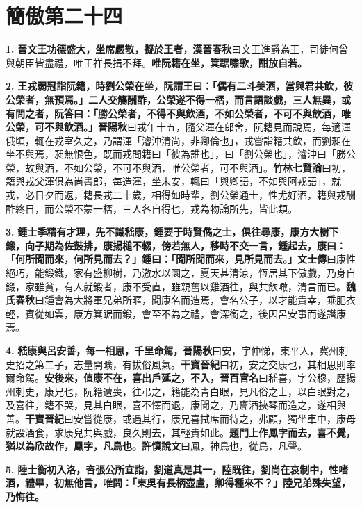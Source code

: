 \chapter{簡傲第二十四}

\textbf{1.} \textbf{晉文王功德盛大，坐席嚴敬，擬於王者，}{\footnotesize \textbf{漢晉春秋}曰文王進爵為王，司徒何曾與朝臣皆盡禮，唯王祥長揖不拜。}\textbf{唯阮籍在坐，箕踞嘯歌，酣放自若。}

\textbf{2.} \textbf{王戎弱冠詣阮籍，時劉公榮在坐，阮謂王曰：「偶有二斗美酒，當與君共飲，彼公榮者，無預焉。」二人交觴酬酢，公榮遂不得一桮，而言語談戲，三人無異，或有問之者，阮答曰：「勝公榮者，不得不與飲酒，不如公榮者，不可不與飲酒，唯公榮，可不與飲酒。」}{\footnotesize \textbf{晉陽秋}曰戎年十五，隨父渾在郎舍，阮籍見而說焉，每適渾俄頃，輒在戎室久之，乃謂渾「濬沖清尚，非卿倫也」，戎嘗詣籍共飲，而劉昶在坐不與焉，昶無恨色，既而戎問籍曰「彼為誰也」，曰「劉公榮也」，濬沖曰「勝公榮，故與酒，不如公榮，不可不與酒，唯公榮者，可不與酒」。\textbf{竹林七賢論}曰初，籍與戎父渾俱為尚書郎，每造渾，坐未安，輒曰「與卿語，不如與阿戎語」，就戎，必日夕而返，籍長戎二十歲，相得如時輩，劉公榮通士，性尤好酒，籍與戎酬酢終日，而公榮不蒙一桮，三人各自得也，戎為物論所先，皆此類。}

\textbf{3.} \textbf{鍾士季精有才理，先不識嵇康，鍾要于時賢儁之士，俱往尋康，康方大樹下鍛，向子期為佐鼓排，康揚槌不輟，傍若無人，移時不交一言，鍾起去，康曰：「何所聞而來，何所見而去？」鍾曰：「聞所聞而來，見所見而去。」}{\footnotesize \textbf{文士傳}曰康性絕巧，能鍛鐵，家有盛柳樹，乃激水以圜之，夏天甚清涼，恆居其下傲戲，乃身自鍛，家雖貧，有人就鍛者，康不受直，雖親舊以雞酒往，與共飲噉，清言而已。\textbf{魏氏春秋}曰鍾會為大將軍兄弟所暱，聞康名而造焉，會名公子，以才能貴幸，乘肥衣輕，賓從如雲，康方箕踞而鍛，會至不為之禮，會深銜之，後因呂安事而遂譖康焉。}

\textbf{4.} \textbf{嵇康與呂安善，每一相思，千里命駕，}{\footnotesize \textbf{晉陽秋}曰安，字仲悌，東平人，冀州刺史招之第二子，志量開曠，有拔俗風氣。\textbf{干寶晉紀}曰初，安之交康也，其相思則率爾命駕。}\textbf{安後來，值康不在，喜出戶延之，不入，}{\footnotesize \textbf{晉百官名}曰嵇喜，字公穆，歷揚州刺史，康兄也，阮籍遭喪，往弔之，籍能為青白眼，見凡俗之士，以白眼對之，及喜往，籍不哭，見其白眼，喜不懌而退，康聞之，乃齎酒挾琴而造之，遂相與善。\textbf{干寶晉紀}曰安嘗從康，或遇其行，康兄喜拭席而待之，弗顧，獨坐車中，康母就設酒食，求康兒共與戲，良久則去，其輕貴如此。}\textbf{題門上作鳳字而去，喜不覺，猶以為欣故作，鳳字，凡鳥也。}{\footnotesize \textbf{許慎說文}曰鳳，神鳥也，從鳥，凡聲。}

\textbf{5.} \textbf{陸士衡初入洛，咨張公所宜詣，劉道真是其一，陸既往，劉尚在哀制中，性嗜酒，禮畢，初無他言，唯問：「東吳有長柄壺盧，卿得種來不？」陸兄弟殊失望，乃悔往。}

